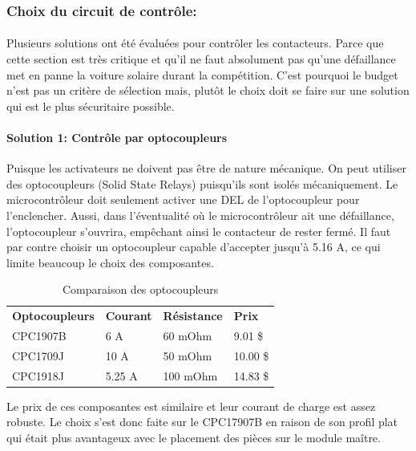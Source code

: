 	\subsubsection*{Choix du circuit de contrôle:}
		\paragraph*{}
		Plusieurs solutions ont été évaluées pour contrôler les contacteurs. Parce que cette section est très critique et qu'il ne faut absolument pas qu'une défaillance met en panne la voiture solaire durant la compétition. C'est pourquoi le budget n'est pas un critère de sélection mais, plutôt le choix doit se faire sur une solution qui est le plus sécuritaire possible.

		\paragraph*{Solution 1: Contrôle par optocoupleurs}
			
		Puisque les activateurs ne doivent pas être de nature mécanique. On peut utiliser des optocoupleurs (Solid State Relays) puisqu'ils sont isolés mécaniquement. Le microcontrôleur doit seulement activer une DEL de l'optocoupleur pour l'enclencher. Aussi, dans l'éventualité où le microcontrôleur ait une défaillance, l'optocoupleur s'ouvrira, empêchant ainsi le contacteur de rester fermé. Il faut par contre choisir un optocoupleur capable d'accepter jusqu'à 5.16 A, ce qui limite beaucoup le choix des composantes.
		
		\begin{table}[H]
			\centering
			\caption{Comparaison des optocoupleurs}
			\label{ComparaisonOpto}
			\begin{tabular}{|p{3cm}|p{3cm}|p{3cm}|p{3cm}|}
				\hline
				\textbf{Optocoupleurs} & \textbf{Courant} & \textbf{Résistance} & \textbf{Prix}
				\\ \hhline{|=|=|=|=|}
				CPC1907B & 6 A & 60 mOhm & 9.01 \$ \\ \hline
				CPC1709J & 10 A & 50 mOhm & 10.00 \$ \\ \hline
				CPC1918J & 5.25 A &	100 mOhm & 14.83 \$	\\ \hline
			\end{tabular}
		\end{table}
		
		Le prix de ces composantes est similaire et leur courant de charge est assez robuste. Le choix s'est donc faite sur le CPC17907B en raison de son profil plat qui était plus avantageux avec le placement des pièces sur le module maître.
		

